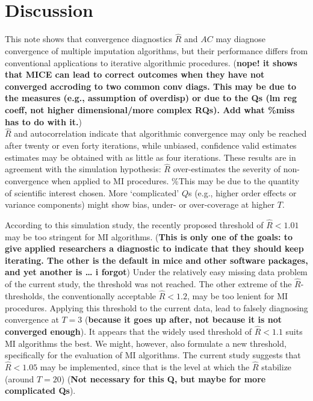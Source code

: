\documentclass[Royal,times,sageh]{sagej}
\begin{document}
\hypertarget{discussion}{%
\section{Discussion}\label{discussion}}

This note shows that convergence diagnostics \(\widehat{R}\) and \(AC\)
may diagnose convergence of multiple imputation algorithms, but their
performance differs from conventional applications to iterative
algorithmic procedures. (\textbf{nope! it shows that MICE can lead to
correct outcomes when they have not converged accroding to two common
conv diags. This may be due to the measures (e.g., assumption of
overdisp) or due to the Qs (lm reg coeff, not higher dimensional/more
complex RQs). Add what \%miss has to do with it.})\\
\(\widehat{R}\) and autocorrelation indicate that algorithmic
convergence may only be reached after twenty or even forty iterations,
while unbiased, confidence valid estimates estimates may be obtained
with as little as four iterations. These results are in agreement with
the simulation hypothesis: \(\widehat{R}\) over-estimates the severity
of non-convergence when applied to MI procedures. \%This may be due to
the quantity of scientific interest chosen. More `complicated' \(Q\)s
(e.g., higher order effects or variance components) might show bias,
under- or over-coverage at higher \(T\).

According to this simulation study, the recently proposed threshold of
\(\widehat{R}<1.01\) may be too stringent for MI algorithms.
(\textbf{This is only one of the goals: to give applied researchers a
diagnostic to indicate that they should keep iterating. The other is the
default in mice and other software packages, and yet another is \ldots{}
i forgot}) Under the relatively easy missing data problem of the current
study, the threshold was not reached. The other extreme of the
\(\widehat{R}\)-thresholds, the conventionally acceptable
\(\widehat{R} <1.2\), may be too lenient for MI procedures. Applying
this threshold to the current data, lead to falsely diagnosing
convergence at \(T = 3\) (\textbf{because it goes up after, not because
it is not converged enough}). It appears that the widely used threshold
of \(\widehat{R} < 1.1\) suits MI algorithms the best. We might,
however, also formulate a new threshold, specifically for the evaluation
of MI algorithms. The current study suggests that \(\widehat{R} < 1.05\)
may be implemented, since that is the level at which the \(\widehat{R}\)
stabilize (around \(T = 20\)) (\textbf{Not necessary for this Q, but
maybe for more complicated Qs}).
\end{document}
